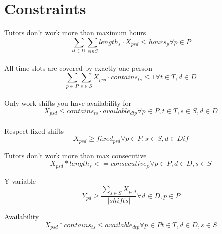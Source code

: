 \documentclass{article}
\begin{document}
\section*{Constraints}
Tutors don't work more than maximum hours
$$\sum_{d \in D} \sum_{s in S} length_s \cdot X_{psd} \leq hours_p \forall p \in P$$ \\

All time slots are covered by exactly one person %
$$\sum_{p \in P} \sum_{s \in S} X_{psd} \cdot contains_{ts} \leq 1 \forall t \in T, d \in D$$ \\

Only work shifts you have availability for %
$$X_{psd} \leq contains_{ts} \cdot available_{dtp} \forall p \in P, t \in T, s \in S, d \in D $$ \\

Respect fixed shifts
$$X_{psd} \geq fixed_{psd} \forall p \in P, s \in S, d \in D if $$

Tutors don't work more than max consecutive
$$ X_{psd} * length_{s} <= consecutive_{p} \forall p \in P, d \in D, s \in S$$

Y variable
$$Y_{pd} \geq \frac{\sum_{s \in S} X_{psd}}{|shifts|}  \forall d \in D, p \in P$$

Availability
$$X_{psd} * contains_{ts} \leq available_{dtp} \forall p \in P t \in T, d \in D, s \in S$$
\end{document}
